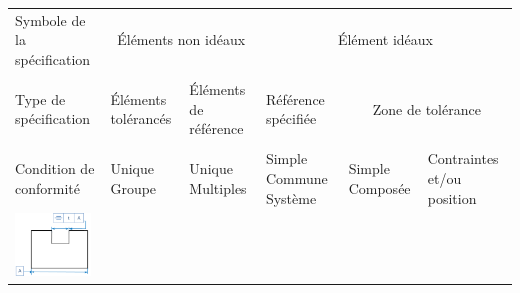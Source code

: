 \documentclass[11pt,oneside]{article}
\begin{document}
\begin{exemple}
\footnotesize{
\begin{center}
\begin{tabular}{|p{}|p{}|p{}|p{}|p{}|p{}|}
\hline
Symbole de la spécification & 
\multicolumn{2}{c|}{Éléments non idéaux} &
\multicolumn{3}{c|}{Élément idéaux} \\
&
\multicolumn{2}{c|}{} &
\multicolumn{3}{c|}{}\\
\hline
Type de spécification & 
Éléments tolérancés &
Éléments de référence & 
Référence spécifiée & 
\multicolumn{2}{c|}{Zone de tolérance} \\
&&&&
\multicolumn{2}{c|}{}\\
\hline
Condition de conformité & 
Unique Groupe & Unique Multiples &
Simple Commune Système &
Simple Composée & 
Contraintes et/ou position \\
\hline
\multirow{12}{*}{\includegraphics[width=2cm]{png/ex_symetrie}}&&&&&\\
&&&&&\\
&&&&&\\
&&&&&\\
&&&&&\\
&&&&&\\
&&&&&\\
&&&&&\\
&&&&&\\
&&&&&\\
&&&&&\\
&&&&&\\
\hline
\end{tabular}
\end{center}
}
\end{exemple}
\end{document}
